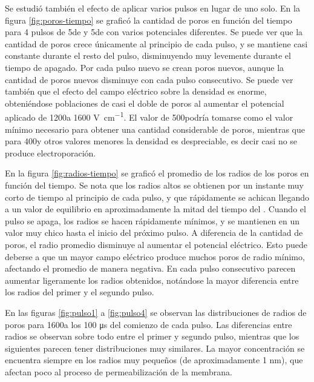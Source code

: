 
Se estudió también el efecto de aplicar varios pulsos en lugar de uno solo. En la figura \ref{fig:poros-tiempo} se graficó la cantidad de poros en función del tiempo para 4 pulsos de 5\ms de \ontime{} y 5\ms de \offtime{} con varios potenciales diferentes. Se puede ver que la cantidad de poros crece únicamente al principio de cada pulso, y se mantiene casi constante durante el resto del pulso, disminuyendo muy levemente durante el tiempo de apagado. Por cada pulso nuevo se crean poros nuevos, aunque la cantidad de poros nuevos disminuye con cada pulso consecutivo. Se puede ver también que el efecto del campo eléctrico sobre la densidad es enorme, obteniéndose poblaciones de casi el doble de poros al aumentar el potencial aplicado de 1200\vcm a 1600 \si{\volt\per\centi\metre}. El valor de 500\vcm podría tomarse como el valor mínimo necesario para obtener una cantidad considerable de poros, mientras que para 400\vcm y otros valores menores la densidad es despreciable, es decir casi no se produce electroporación. 

En la figura \ref{fig:radios-tiempo} se graficó el promedio de los radios de los poros en función del tiempo. Se nota que los radios altos se obtienen por un instante muy corto de tiempo al principio de cada pulso, y que rápidamente se achican llegando a un valor de equilibrio en aproximadamente la mitad del tiempo del \ontime. Cuando el pulso se apaga, los radios se hacen rápidamente mínimos, y se mantienen en un valor muy chico hasta el inicio del próximo pulso. A diferencia de la cantidad de poros, el radio promedio disminuye al aumentar el potencial eléctrico. Esto puede deberse a que un mayor campo eléctrico produce muchos poros de radio mínimo, afectando el promedio de manera negativa. En cada pulso consecutivo parecen aumentar ligeramente los radios obtenidos, notándose la mayor diferencia entre los radios del primer y el segundo pulso. 

En las figuras \ref{fig:pulso1} a \ref{fig:pulso4} se observan las distribuciones de radios de poros para 1600\vcm a los 100 \si{\micro\second} del comienzo de cada pulso. Las diferencias entre radios se observan sobre todo entre el primer y segundo pulso, mientras que los siguientes parecen tener distribuciones muy similares. La mayor concentración se encuentra siempre en los radios muy pequeños (de aproximadamente 1 \si{\nano\metre}), que afectan poco al proceso de permeabilización de la membrana.

\clearpage

